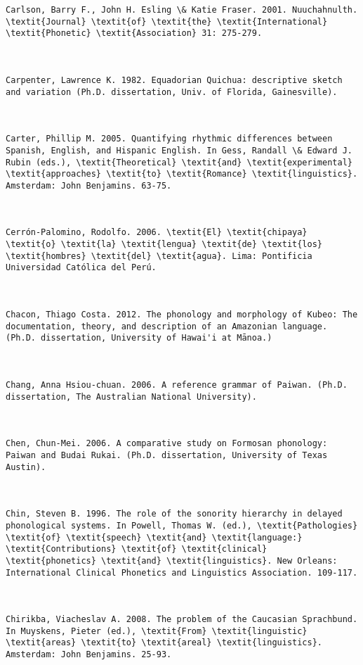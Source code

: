 \begin{verbatim}
Carlson, Barry F., John H. Esling \& Katie Fraser. 2001. Nuuchahnulth. \textit{Journal} \textit{of} \textit{the} \textit{International} \textit{Phonetic} \textit{Association} 31: 275-279.



Carpenter, Lawrence K. 1982. Equadorian Quichua: descriptive sketch and variation (Ph.D. dissertation, Univ. of Florida, Gainesville).



Carter, Phillip M. 2005. Quantifying rhythmic differences between Spanish, English, and Hispanic English. In Gess, Randall \& Edward J. Rubin (eds.), \textit{Theoretical} \textit{and} \textit{experimental} \textit{approaches} \textit{to} \textit{Romance} \textit{linguistics}. Amsterdam: John Benjamins. 63-75.



Cerrón-Palomino, Rodolfo. 2006. \textit{El} \textit{chipaya} \textit{o} \textit{la} \textit{lengua} \textit{de} \textit{los} \textit{hombres} \textit{del} \textit{agua}. Lima: Pontificia Universidad Católica del Perú.



Chacon, Thiago Costa. 2012. The phonology and morphology of Kubeo: The documentation, theory, and description of an Amazonian language. (Ph.D. dissertation, University of Hawai'i at Mānoa.)



Chang, Anna Hsiou-chuan. 2006. A reference grammar of Paiwan. (Ph.D. dissertation, The Australian National University).



Chen, Chun-Mei. 2006. A comparative study on Formosan phonology: Paiwan and Budai Rukai. (Ph.D. dissertation, University of Texas Austin).



Chin, Steven B. 1996. The role of the sonority hierarchy in delayed phonological systems. In Powell, Thomas W. (ed.), \textit{Pathologies} \textit{of} \textit{speech} \textit{and} \textit{language:} \textit{Contributions} \textit{of} \textit{clinical} \textit{phonetics} \textit{and} \textit{linguistics}. New Orleans: International Clinical Phonetics and Linguistics Association. 109-117.



Chirikba, Viacheslav A. 2008. The problem of the Caucasian Sprachbund. In Muyskens, Pieter (ed.), \textit{From} \textit{linguistic} \textit{areas} \textit{to} \textit{areal} \textit{linguistics}. Amsterdam: John Benjamins. 25-93.




\end{verbatim}

